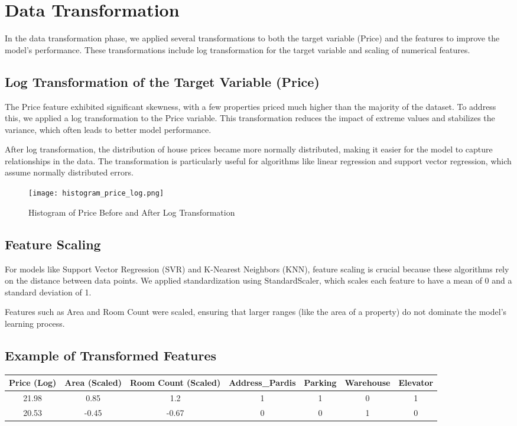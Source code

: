 \documentclass{article}
\begin{document}
\section{Data Transformation}
In the data transformation phase, we applied several transformations to both the target variable (Price) and the features to improve the model's performance. These transformations include log transformation for the target variable and scaling of numerical features.

\subsection{Log Transformation of the Target Variable (Price)}
The Price feature exhibited significant skewness, with a few properties priced much higher than the majority of the dataset. To address this, we applied a log transformation to the Price variable. This transformation reduces the impact of extreme values and stabilizes the variance, which often leads to better model performance.

After log transformation, the distribution of house prices became more normally distributed, making it easier for the model to capture relationships in the data. The transformation is particularly useful for algorithms like linear regression and support vector regression, which assume normally distributed errors.

\begin{figure}[h]
    \centering
    \texttt{[image: histogram\_price\_log.png]}
    \caption{Histogram of Price Before and After Log Transformation}
    \label{fig:histogram_price_log}
\end{figure}

\subsection{Feature Scaling}
For models like Support Vector Regression (SVR) and K-Nearest Neighbors (KNN), feature scaling is crucial because these algorithms rely on the distance between data points. We applied standardization using StandardScaler, which scales each feature to have a mean of 0 and a standard deviation of 1.

Features such as Area and Room Count were scaled, ensuring that larger ranges (like the area of a property) do not dominate the model’s learning process.

\subsection{Example of Transformed Features}
\begin{center}
\begin{tabular}{ccccccc}
\toprule
Price (Log) & Area (Scaled) & Room Count (Scaled) & Address\_Pardis & Parking & Warehouse & Elevator \\
\midrule
21.98 & 0.85 & 1.2 & 1 & 1 & 0 & 1 \\
20.53 & -0.45 & -0.67 & 0 & 0 & 1 & 0 \\
\bottomrule
\end{tabular}
\end{center}
\end{document}
